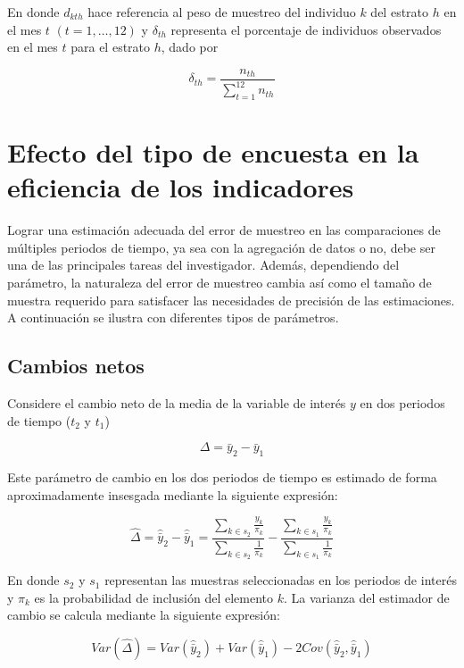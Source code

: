 \documentclass[
  12pt,
]{book}
\begin{document}
En donde \(d_{kth}\) hace referencia al peso de muestreo del individuo \(k\)
del estrato \(h\) en el mes \(t\) \((t=1, \ldots, 12)\) y \(\delta_{th}\)
representa el porcentaje de individuos observados en el mes \(t\) para
el estrato \(h\), dado por

\[
\delta_{th} = \frac{n_{th}}{\sum_{t = 1} ^{12} n_{th}}
\]

\hypertarget{efecto-del-tipo-de-encuesta-en-la-eficiencia-de-los-indicadores}{%
\section{Efecto del tipo de encuesta en la eficiencia de los indicadores}\label{efecto-del-tipo-de-encuesta-en-la-eficiencia-de-los-indicadores}}

Lograr una estimación adecuada del error de muestreo en las
comparaciones de múltiples periodos de tiempo, ya sea con la agregación
de datos o no, debe ser una de las principales tareas del investigador.
Además, dependiendo del parámetro, la naturaleza del error de muestreo
cambia así como el tamaño de muestra requerido para satisfacer las
necesidades de precisión de las estimaciones. A continuación se ilustra con diferentes tipos de parámetros.

\hypertarget{cambios-netos}{%
\subsection{Cambios netos}\label{cambios-netos}}

Considere el cambio neto de la media de la variable de
interés \(y\) en dos periodos de tiempo (\(t_2\) y \(t_1\))

\[
\Delta = \bar{y}_2 - \bar{y}_1
\]

Este parámetro de cambio en los dos periodos de tiempo es estimado de
forma aproximadamente insesgada mediante la siguiente expresión:

\[
\hat{\Delta} = 
\hat{\bar{y}}_2 - \hat{\bar{y}}_1
= \frac{\sum_{k\in s_2}\frac{y_{k}}{\pi_k}}{\sum_{k\in s_2}\frac{1}{\pi_k}} - \frac{\sum_{k\in s_1}\frac{y_{k}}{\pi_k}}{\sum_{k\in s_1}\frac{1}{\pi_k}}
\]

En donde \(s_2\) y \(s_1\) representan las muestras seleccionadas en los
periodos de interés y \(\pi_k\) es la probabilidad de inclusión del
elemento \(k\). La varianza del estimador de cambio se calcula mediante la
siguiente expresión:

\[
Var(\hat{\Delta}) = Var(\hat{\bar{y}}_2) + Var(\hat{\bar{y}}_1) - 2Cov(\hat{\bar{y}}_2, \hat{\bar{y}}_1)
\]
\end{document}
